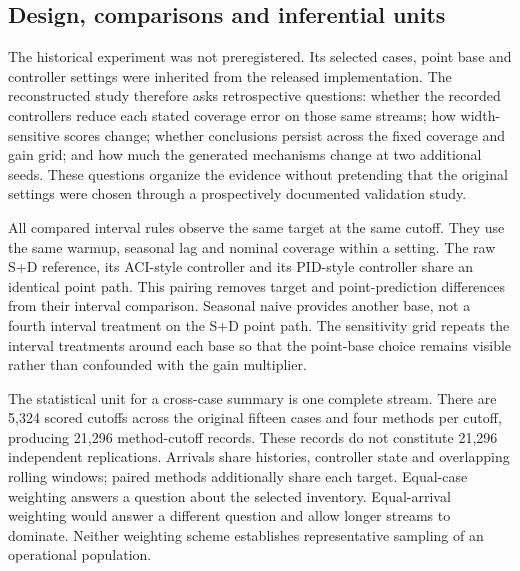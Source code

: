 \subsection{Design, comparisons and inferential units}
The historical experiment was not preregistered. Its selected cases, point base and controller settings were inherited from the released implementation. The reconstructed study therefore asks retrospective questions: whether the recorded controllers reduce each stated coverage error on those same streams; how width-sensitive scores change; whether conclusions persist across the fixed coverage and gain grid; and how much the generated mechanisms change at two additional seeds. These questions organize the evidence without pretending that the original settings were chosen through a prospectively documented validation study.

All compared interval rules observe the same target at the same cutoff. They use the same warmup, seasonal lag and nominal coverage within a setting. The raw S+D reference, its ACI-style controller and its PID-style controller share an identical point path. This pairing removes target and point-prediction differences from their interval comparison. Seasonal naive provides another base, not a fourth interval treatment on the S+D point path. The sensitivity grid repeats the interval treatments around each base so that the point-base choice remains visible rather than confounded with the gain multiplier.

The statistical unit for a cross-case summary is one complete stream. There are 5,324 scored cutoffs across the original fifteen cases and four methods per cutoff, producing 21,296 method-cutoff records. These records do not constitute 21,296 independent replications. Arrivals share histories, controller state and overlapping rolling windows; paired methods additionally share each target. Equal-case weighting answers a question about the selected inventory. Equal-arrival weighting would answer a different question and allow longer streams to dominate. Neither weighting scheme establishes representative sampling of an operational population.

